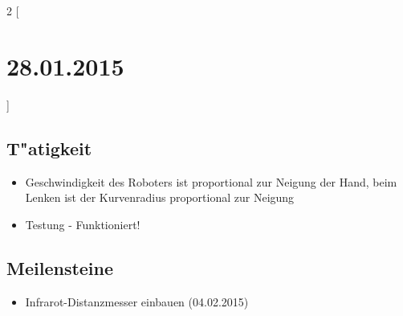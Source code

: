 \documentclass[11pt,a4paper]{article}
\begin{document}
\newpage

\begin{multicols}{2}
[\section*{  28.01.2015  }] 

\subsection*{T"atigkeit}
\begin{itemize}
\item Geschwindigkeit des Roboters ist proportional zur Neigung der Hand, beim Lenken ist der Kurvenradius proportional zur Neigung
\item Testung - Funktioniert!
\end{itemize}

\columnbreak

\subsection*{Meilensteine}

\begin{itemize}
\item Infrarot-Distanzmesser einbauen (04.02.2015)
\end{itemize}

\end{multicols}
\end{document}
